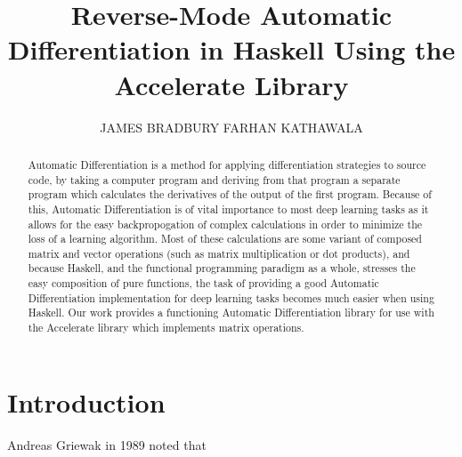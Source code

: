 \documentclass[prodmode,acmtecs]{acmsmall} %
\begin{document}
\title{Reverse-Mode Automatic Differentiation in Haskell Using the Accelerate Library}
\author{JAMES BRADBURY
FARHAN KATHAWALA
}

\begin{abstract}
Automatic Differentiation is a method for applying differentiation strategies to source
code, by taking a computer program and deriving from that program a separate program which
calculates the derivatives of the output of the first program. Because of this, Automatic
Differentiation is of vital importance to most deep learning tasks as it allows
for the easy backpropogation of complex calculations in order to minimize the loss of a
learning algorithm. Most of these calculations are some variant of composed matrix and vector
operations (such as matrix multiplication or dot products), and because Haskell, and the
functional programming paradigm as a whole, stresses the easy composition of pure functions,
the task of providing a good Automatic Differentiation implementation for deep learning
tasks becomes much easier when using Haskell. Our work provides a functioning Automatic
Differentiation library for use with the Accelerate library which implements matrix
operations.
\end{abstract}

%



\maketitle


\section{Introduction}

Andreas Griewak in 1989 noted that \cite{griewank1989}
\end{document}
